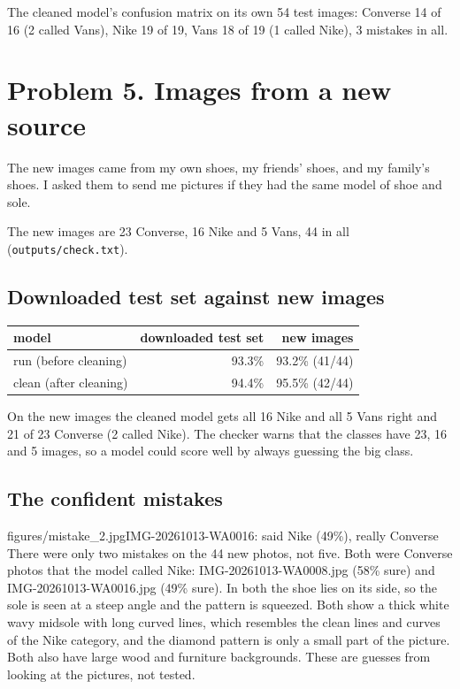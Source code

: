 \documentclass[11pt]{article}
\begin{document}
\begin{center}\end{center}
The cleaned model's confusion matrix on its own 54 test images: Converse 14 of 16 (2 called Vans), Nike 19 of 19, Vans 18 of 19 (1 called Nike), 3 mistakes in all.

\section*{Problem 5. Images from a new source}
The new images came from my own shoes, my friends' shoes, and my family's shoes. I asked them to send me pictures if they had the same model of shoe and sole.


The new images are 23 Converse, 16 Nike and 5 Vans, 44 in all (\texttt{outputs/check.txt}).

\subsection*{Downloaded test set against new images}
\begin{center}\small
\begin{tabular}{lrr}
\toprule
model & downloaded test set & new images \\
\midrule
run (before cleaning) & 93.3\% & 93.2\% (41/44) \\
clean (after cleaning) & 94.4\% & 95.5\% (42/44) \\
\bottomrule
\end{tabular}
\end{center}
On the new images the cleaned model gets all 16 Nike and all 5 Vans right and 21 of 23 Converse (2 called Nike). The checker warns that the classes have 23, 16 and 5 images, so a model could score well by always guessing the big class.

\subsection*{The confident mistakes}
           {figures/mistake_2.jpg}{IMG-20261013-WA0016: said Nike (49\%), really Converse}
There were only two mistakes on the 44 new photos, not five. Both were Converse photos that the model called Nike: IMG-20261013-WA0008.jpg (58\% sure) and IMG-20261013-WA0016.jpg (49\% sure). In both the shoe lies on its side, so the sole is seen at a steep angle and the pattern is squeezed. Both show a thick white wavy midsole with long curved lines, which resembles the clean lines and curves of the Nike category, and the diamond pattern is only a small part of the picture. Both also have large wood and furniture backgrounds. These are guesses from looking at the pictures, not tested.
\end{document}
